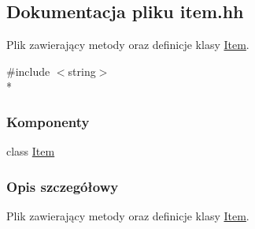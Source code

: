 \hypertarget{item_8hh}{\subsection{Dokumentacja pliku item.\-hh}
\label{item_8hh}
}


Plik zawierający metody oraz definicje klasy \hyperlink{class_item}{Item}.  


{\ttfamily \#include $<$string$>$}\\*
\subsubsection*{Komponenty}
\begin{DoxyCompactItemize}
\item 
class \hyperlink{class_item}{Item}
\end{DoxyCompactItemize}


\subsubsection{Opis szczegółowy}
Plik zawierający metody oraz definicje klasy \hyperlink{class_item}{Item}. 
